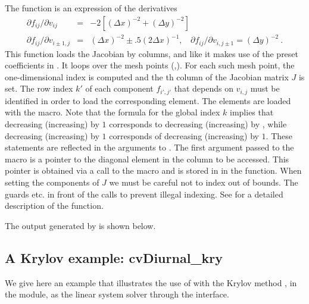 The  function is an expression of the derivatives
\vspace*{-.08in}
\begin{eqnarray*}
\partial f_{ij} / \partial v_{ij} &=&
         -2 [(\Delta x)^{-2} + (\Delta y)^{-2}] \\
\partial f_{ij} / \partial v_{i \pm 1,j} &=& (\Delta x)^{-2} 
                  \pm .5 (2 \Delta x)^{-1}, ~~~~
\partial f_{ij} / \partial v_{i,j \pm 1}  =  (\Delta y)^{-2} ~. 
\end{eqnarray*}
This function loads the Jacobian by columns, and like  it
makes use of the preset coefficients in .
It loops over the mesh points (,). For each such mesh
point, the one-dimensional index  is computed
and the th column of the Jacobian matrix $J$ is set. 
The row index $k'$ of each component $f_{i',j'}$ that depends on
$v_{i,j}$ must be identified in order to load the corresponding element.
The elements are loaded with the  macro.
Note that the formula for the global index $k$ implies that decreasing 
(increasing)  by $1$ corresponds to decreasing (increasing) 
 by , while decreasing (increasing)  by $1$ 
corresponds of decreasing (increasing)  by $1$. 
These statements are reflected in the arguments to
.  The first argument passed to the
 macro is a pointer to the diagonal element
in the column to be accessed. This pointer is obtained via a call to
the  macro and is stored in  in 
the  function. When setting the components of $J$ we must be
careful not to index out of bounds. The guards  etc.
in front of the calls to  prevent illegal
indexing. See  for a detailed description of the
 function.

The output generated by  is shown below.



\subsection{A Krylov example: cvDiurnal\_kry}\label{ss:cvDiurnal}

We give here an example that illustrates the use of {\cvode} with the Krylov
method {\spgmr}, in the {\sunlinsolspgmr} module, as the linear system
solver through the {\cvspils} interface.

